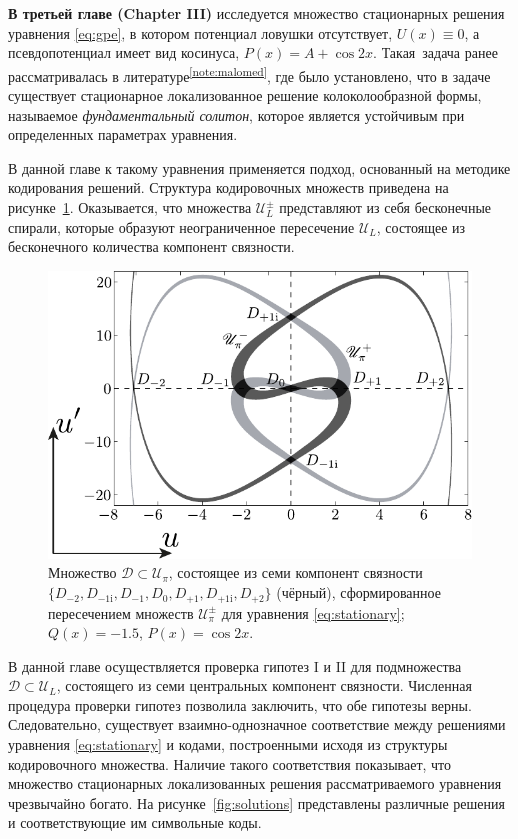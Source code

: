 \documentclass[candidate, href, colorlinks]{disser}
\begin{document}
\textbf{В третьей главе (Chapter III)} исследуется множество стационарных решения уравнения \eqref{eq:gpe}, в котором потенциал ловушки отсутствует, $U(x) \equiv 0$, а псевдопотенциал имеет вид косинуса, $P(x) = A + \cos 2x$.
Такая задача ранее рассматривалась в литературе\textsuperscript{\ref{note:malomed}}, где было установлено, что в задаче существует стационарное локализованное решение колоколообразной формы, называемое {\it фундаментальный солитон}, которое является устойчивым при определенных параметрах уравнения.

В данной главе к такому уравнения применяется подход, основанный на методике кодирования решений.
Структура кодировочных множеств приведена на рисунке~\ref{fig:island-set}.
Оказывается, что множества $\mathscr{U}_L^{\pm}$ представляют из себя бесконечные спирали, которые образуют неограниченное пересечение $\mathscr{U}_L$, состоящее из бесконечного количества компонент связности.

\begin{figure}[h]
\centering
	\includegraphics[scale = 1]{../pic/island set to check hypotheses for cosine equation}
	\caption{
		Множество $\mathcal{D} \subset \mathscr{U}_{\pi}$, состоящее из семи компонент связности $\{ D_{-2}, D_{-1\mathrm{i}}, D_{-1}, D_0, D_{+1}, D_{+1\mathrm{i}}, D_{+2} \}$ (чёрный), сформированное пересечением множеств $\mathscr{U}_{\pi}^{\pm}$ для уравнения \eqref{eq:stationary}; $Q(x) = -1.5$, $P(x) = \cos 2x$.
	}
\label{fig:island-set}
\end{figure}

В данной главе осуществляется проверка гипотез I и II для подмножества $\mathcal{D} \subset \mathscr{U}_L$, состоящего из семи центральных компонент связности.
Численная процедура проверки гипотез позволила заключить, что обе гипотезы верны.
Следовательно, существует взаимно-однозначное соответствие между решениями уравнения \eqref{eq:stationary} и кодами, построенными исходя из структуры кодировочного множества.
Наличие такого соответствия показывает, что множество стационарных локализованных решения рассматриваемого уравнения чрезвычайно богато.
На рисунке~\ref{fig:solutions} представлены различные решения и соответствующие им символьные коды.
\end{document}
